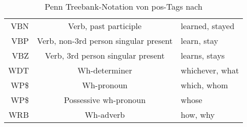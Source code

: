 \begin{table}[h]
\begin{tabular}{ r c l }
    VBN & Verb, past participle & learned, stayed \\
    VBP & Verb, non-3rd person singular present & learn, stay \\
    VBZ & Verb, 3rd person singular present & learns, stays \\
    WDT & Wh-determiner & whichever, what \\
    WP\$ & Wh-pronoun & which, whom \\
    WP\$ & Possessive wh-pronoun & whose \\
    WRB & Wh-adverb & how, why \\
    \bottomrule
  \end{tabular}
  \caption{Penn Treebank-Notation von \acs{pos}-Tags nach \citet{penntreebankpos}}
  \label{tab:penntreebankpos}
\end{table}
